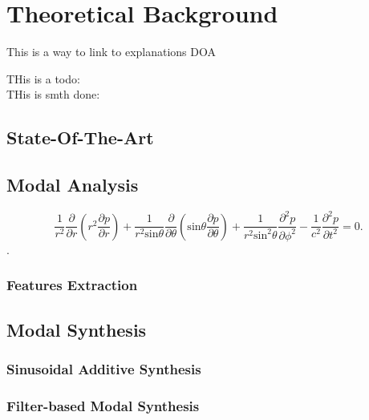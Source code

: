\chapter{Theoretical Background}\label{ch:theory}
\mbox{}\par
This is a way to link to explanations \gls{DOA} 

THis is a todo: \\
THis is smth done:\\
\done{}

\section{State-Of-The-Art}\label{sec:state_art}

\section{Modal Analysis}\label{sec:modal_analysis}
\mbox{}\par

\begin{equation}\label{eq:spherical_wave}
 \frac{1}{r^2}\frac{\partial}{\partial r}(r^2 \frac{\partial p}{\partial r})+\frac{1}{r^2 \text{sin}\theta}\frac{\partial}{\partial \theta}(\text{sin}\theta\frac{\partial p}{\partial \theta}) + \frac{1}{r^2 \text{sin}^2\theta}\frac{\partial^2 p}{\partial \phi^2}-\frac{1}{c^2}\frac{\partial^2 p}{\partial t^2} = 0.
\end{equation}
 \cite{bib:fourierAcoustics}.
\subsection{Features Extraction}\label{sec:features_extract}
\mbox{}\par
 
\section{Modal Synthesis}\label{sec:modal_synth}
\mbox{}\par 


\subsection{Sinusoidal Additive Synthesis}\label{sec:sin_synth}
\mbox{}\par
\subsection{Filter-based Modal Synthesis}\label{sec:add_synth}
\mbox{}\par
